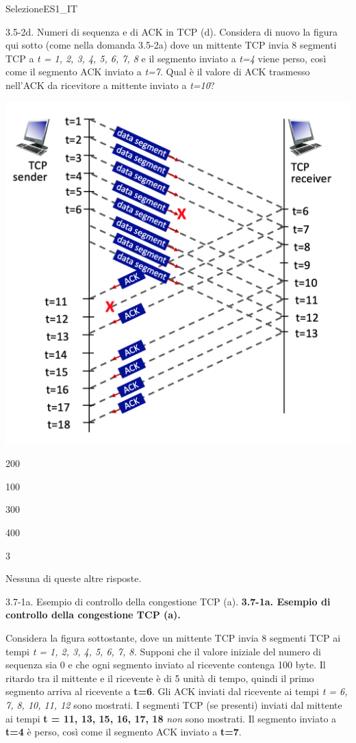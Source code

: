 \documentclass[a4paper]{article}
\begin{document}
\begin{quiz}{SelezioneES1\_IT}
\begin{multi}[points=1,shuffle]{3.5-2d. Numeri di sequenza e di ACK in TCP (d).}
Considera di nuovo la figura qui sotto (come nella domanda 3.5-2a) dove un mittente TCP invia 8 segmenti TCP a \emph{t = 1, 2, 3, 4, 5, 6, 7, 8} e il segmento inviato a \emph{t=4} viene perso, così come il segmento ACK inviato a \emph{t=7}. Qual è il valore di ACK trasmesso nell'ACK da ricevitore a mittente inviato a \emph{t=10}?
\begin{center}
	\includegraphics[width=\linewidth]{figs/tcp_seq_ack_1.jpg}
\end{center}
\item 200
\item 100
\item* 300
\item 400
\item 3
\item Nessuna di queste altre risposte.
\end{multi}

\begin{multi}[points=1,shuffle]{3.7-1a. Esempio di controllo della congestione TCP (a).}
\textbf{3.7-1a. Esempio di controllo della congestione TCP (a).}

Considera la figura sottostante, dove un mittente TCP invia 8 segmenti TCP ai tempi \emph{t = 1, 2, 3, 4, 5, 6, 7, 8.} Supponi che il valore iniziale del numero di sequenza sia 0 e che ogni segmento inviato al ricevente contenga 100 byte. Il ritardo tra il mittente e il ricevente è di 5 unità di tempo, quindi il primo segmento arriva al ricevente a \textbf{t=6}. Gli ACK inviati dal ricevente ai tempi \emph{t = 6, 7, 8, 10, 11, 12} sono mostrati. I segmenti TCP (se presenti) inviati dal mittente ai tempi \textbf{t = 11, 13, 15, 16, 17, 18} \emph{non} sono mostrati. Il segmento inviato a \textbf{t=4} è perso, così come il segmento ACK inviato a \textbf{t=7}.


\end{multi}
\end{quiz}
\end{document}
